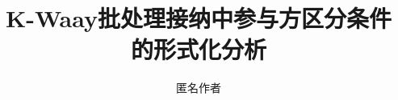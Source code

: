 \newif\ifanonymous
\anonymoustrue

\title{K-Waay批处理接纳中参与方区分条件的形式化分析}

\ifanonymous
  \author{匿名作者}
\else
  \author{作者信息待补充}
\fi

\date{}
